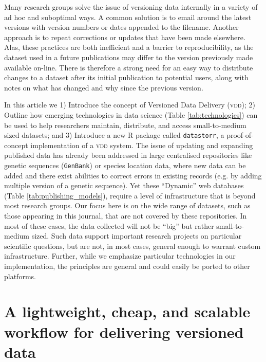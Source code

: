 \documentclass[english]{article}
\begin{document}
Many research groups solve the issue of versioning data internally in a variety of ad hoc and suboptimal ways. A common solution is to email around the latest versions with version numbers or dates appended to the filename. Another approach is to repeat corrections or updates that have been made elsewhere. Alas, these practices are both inefficient and a barrier to reproducibility, as the dataset used in a future publications may differ to the version previously made available on-line. There is therefore a strong need for an easy way to distribute changes to a dataset after its initial publication to potential users, along with notes on what has changed and why since the previous version.

In this article we 1) Introduce the concept of Versioned Data Delivery (\textsc{vdd}); 2) Outline how emerging technologies in data science (Table \ref{tab:technologies}) can be used to help researchers maintain, distribute, and access small-to-medium sized datasets; and 3) Introduce a new \textsc{R} package called \texttt{datastorr}, a proof-of-concept implementation of a \textsc{vdd} system. The issue of updating and expanding published data has already been addressed in large centralised repositories like genetic sequences (\texttt{GenBank}) or species location data, where new data can be added and there exist abilities to correct errors in existing records (e.g. by adding multiple version of a genetic sequence). Yet these ``Dynamic'' web databases (Table \ref{tab:publishing_models}), require a level of infrastructure that is beyond most research groups. Our focus here is on the wide range of datasets, such as those appearing in this journal, that are not covered by these repositories. In most of these cases, the data collected will not be ``big'' but rather small-to-medium sized. Such data support important research projects on particular scientific questions, but are not, in most cases, general enough to warrant custom infrastructure. Further, while we emphasize particular technologies in our implementation, the principles are general and could easily be ported to other platforms.

\section*{A lightweight, cheap, and scalable workflow for delivering versioned data}
\end{document}
